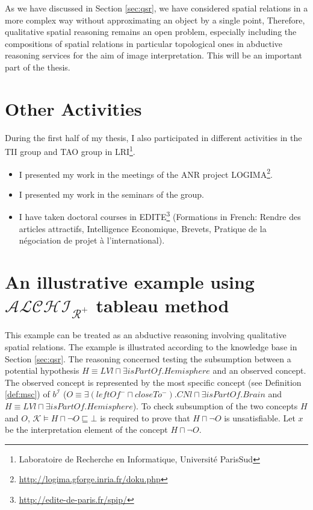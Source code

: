 \documentclass{article}
\begin{document}
As we have discussed in Section \ref{sec:qsr}, we have considered spatial relations in a more complex way without approximating an object by a single point,
Therefore, qualitative spatial reasoning remains an open problem, especially including the compositions of spatial relations in particular topological ones
in abductive reasoning services for the aim of image interpretation. This will be an important part of the thesis.

\section{Other Activities}
During the first half of my thesis, I also participated in different activities in the TII group and TAO group 
in LRI\footnote{Laboratoire de Recherche en Informatique, Universit\'{e} ParisSud}.
\begin{itemize}
 \item I presented my work in the meetings of the ANR project LOGIMA\footnote{\url{http://logima.gforge.inria.fr/doku.php}}.
 \item I presented my work in the seminars of the group.
 \item I have taken doctoral courses in EDITE\footnote{\url{http://edite-de-paris.fr/spip/}}
 (Formations in French: Rendre des articles attractifs, Intelligence Economique, Brevets, Pratique de la négociation de projet à l'international).
\end{itemize}

\appendix
\section{An illustrative example using $\mathcal{ALCHI_{R^+}}$ tableau method}
\label{Appendix A}

This example can be treated as an abductive reasoning involving qualitative spatial relations.
The example is illustrated according to the knowledge base in Section \ref{sec:qsr}.
The reasoning concerned testing the subsumption between a potential hypothesis $H\equiv LVl\sqcap \exists isPartOf.Hemisphere$ and an observed concept.
The observed concept is represented by the most specific concept (see Definition \ref{def:msc}) of  $b^\mathcal{I}$
($O\equiv \exists (leftOf^-\sqcap closeTo^-). CNl\sqcap \exists isPartOf.Brain$ and $H\equiv LVl\sqcap \exists isPartOf.Hemisphere$).
To check subsumption of the two concepts $H$ and $O$, $\mathcal{K} \vDash H\sqcap \neg O \sqsubseteq \bot$ is required to prove that $H\sqcap \neg O$ is unsatisfiable.
Let $x$ be the interpretation element of the concept $H\sqcap \neg O$.
\end{document}
